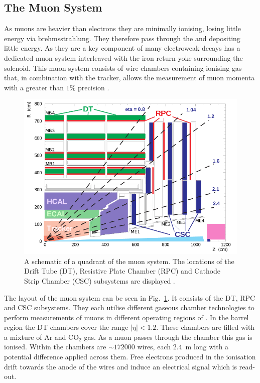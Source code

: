 \subsection{The Muon System} 

As muons are heavier than electrons they are minimally ionising,
losing little energy via brehmsstrahlung. They therefore pass through
the \ECAL and \HCAL depositing little energy. As they are a key
component of many electroweak decays \CMS has a dedicated muon system
interleaved with the iron return yoke surrounding the solenoid. This
muon system consists of wire chambers containing ionising gas that, in
combination with the tracker, allows the measurement of muon momenta
with a greater than $1\%$ precision \cite{CMS:1997dma}.

\begin{figure}
\begin{center}
\includegraphics[width=0.8\linewidth]{figs/cms_muon} \end{center}
\caption{ A schematic of a quadrant of the \CMS muon system. The
locations of the Drift Tube (DT), Resistive Plate Chamber (RPC) and
Cathode Strip Chamber (CSC) subsystems are displayed
\cite{Kim:2012ix}.}
\label{fig:muon} \end{figure}

The layout of the muon system can be seen in Fig.~\ref{fig:muon}. It
consists of the \ac{DT}, \ac{RPC} and \ac{CSC} subsystems. They each
utilise different gaseous chamber technologies to perform measurements
of muons in different operating regions of \CMS. In the barrel region
the \ac{DT} chambers cover the range $|\eta|<1.2$. These chambers are
filled with a mixture of Ar and CO$_2$ gas. As a muon
passes through the chamber this gas is ionised. Within the chambers
are $\sim172000$ wires, each $2.4$~m long with a potential difference
applied across them. Free electrons produced in the ionisation drift
towards the anode of the wires and induce an electrical signal which
is read-out. 

